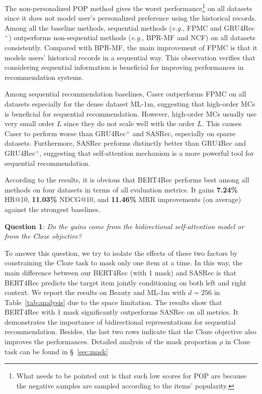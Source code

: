 The non-personalized POP method gives the worst performance\footnote{What needs to be pointed out is that such low scores for POP are because the negative samples are sampled according to the items' popularity.} on all datasets since it does not model user's personalized preference using the historical records. Among all the baseline methods, sequential methods (\textit{e.g.}, FPMC and GRU4Rec$^+$) outperforms non-sequential methods (\textit{e.g.}, BPR-MF and NCF) on all datasets consistently. Compared with BPR-MF, the main improvement of FPMC is that it models users' historical records in a sequential way. This observation verifies that considering sequential information is beneficial for improving performances in recommendation systems.

Among sequential recommendation baselines, Caser outperforms FPMC on all datasets especially for the dense dataset ML-1m, suggesting that high-order MCs is beneficial for sequential recommendation. However, high-order MCs usually use very small order $L$ since they do not scale well with the order $L$. This causes Caser to perform worse than GRU4Rec$^+$ and SASRec, especially on sparse datasets. Furthermore, SASRec performs distinctly better than GRU4Rec and GRU4Rec$^+$, suggesting that self-attention mechanism is a more powerful tool for sequential recommendation.

According to the results, it is obvious that BERT4Rec performs best  among all methods on four datasets in terms of all evaluation metrics. It gains \textbf{7.24\%} HR@10, \textbf{11.03\%} NDCG@10, and \textbf{11.46\%} MRR improvements (on average) against the strongest baselines.

 \textbf{Question 1}: \textit{Do the gains come from the bidirectional self-attention model or from the Cloze objective?}

To answer this question, we try to isolate the effects of these two factors by constraining the Cloze task to mask only one item at a time. In this way, the main difference between our BERT4Rec (with 1 mask) and SASRec is that BERT4Rec predicts the target item jointly conditioning on both left and right context. We report the results on Beauty and ML-1m with $d=256$ in Table~\ref{tab:analysis} due to the space limitation. The results show that BERT4Rec with 1 mask significantly outperforms SASRec on all metrics. It demonstrates the importance of bidirectional representations for sequential recommendation. Besides, the last two rows indicate that the Cloze objective also improves the performances. Detailed analysis of the mask proportion $\rho$ in Cloze task can be found in \S~\ref{sec:mask}

